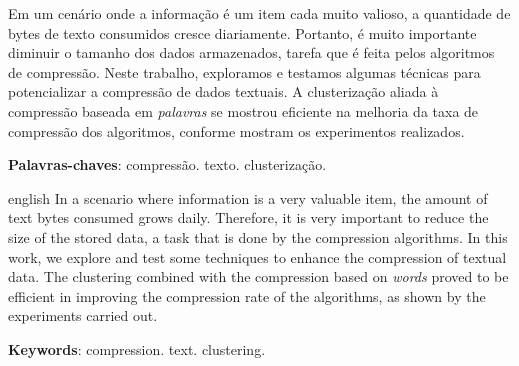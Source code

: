 
\setlength{\absparsep}{18pt} %
\begin{resumo}
Em um cenário onde a informação é um item cada muito valioso, a quantidade de bytes de texto consumidos cresce diariamente.
Portanto, é muito importante diminuir o tamanho dos dados armazenados, tarefa que é feita pelos algoritmos de compressão.
Neste trabalho, exploramos e testamos algumas técnicas para potencializar a compressão de dados textuais.
A clusterização aliada à compressão baseada em \emph{palavras} se mostrou eficiente na melhoria da taxa de compressão dos algoritmos, conforme mostram os experimentos realizados.

 \textbf{Palavras-chaves}: compressão. texto. clusterização.
\end{resumo}

\begin{resumo}[Abstract]
 \begin{otherlanguage*}{english}
In a scenario where information is a very valuable item, the amount of text bytes consumed grows daily.
Therefore, it is very important to reduce the size of the stored data, a task that is done by the compression algorithms.
In this work, we explore and test some techniques to enhance the compression of textual data.
The clustering combined with the compression based on \emph{words} proved to be efficient in improving the compression rate of the algorithms, as shown by the experiments carried out.
  
  

   \noindent 
   \textbf{Keywords}: compression. text. clustering.
 \end{otherlanguage*}
\end{resumo}